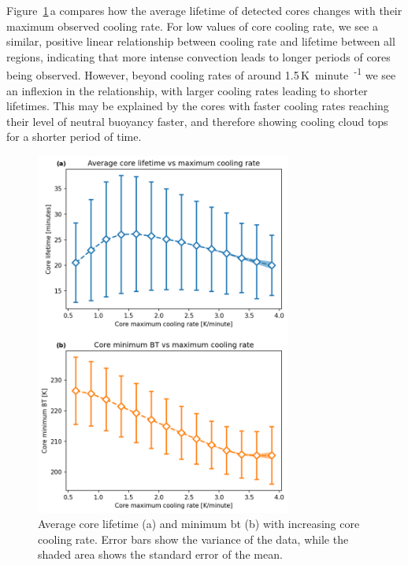 Figure~\ref{fig:core_cooling_rate_relations}\,a compares how the average lifetime of detected cores changes with their maximum observed cooling rate.
For low values of core cooling rate, we see a similar, positive linear relationship between cooling rate and lifetime between all regions, indicating that more intense convection leads to longer periods of cores being observed.
However, beyond cooling rates of around 1.5\,\unit{K minute\textsuperscript{-1}} we see an inflexion in the relationship, with larger cooling rates leading to shorter lifetimes.
This may be explained by the cores with faster cooling rates reaching their level of neutral buoyancy faster, and therefore showing cooling cloud tops for a shorter period of time.

\begin{figure}[tp]
    \centering
    \includegraphics[width=0.75\textwidth]{figures/ch2_10.png}
    \caption[
    Average core lifetime and minimum \acrshort{bt} with increasing core cooling rate
    ]{
    Average core lifetime (a) and minimum \acrshort{bt} (b) with increasing core cooling rate. Error bars show the variance of the data, while the shaded area shows the standard error of the mean.
    }
    \label{fig:core_cooling_rate_relations}
\end{figure}

